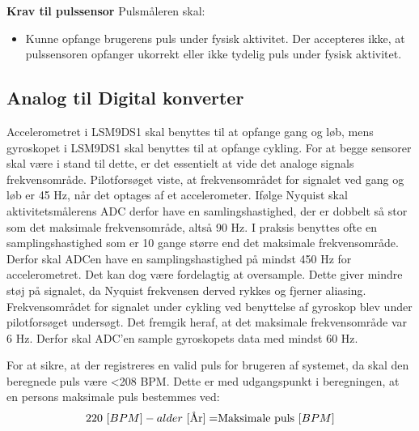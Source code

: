 \textbf{Krav til pulssensor} \newline
Pulsmåleren skal:
\begin{itemize}
\item Kunne opfange brugerens puls under fysisk aktivitet. Der accepteres ikke, at pulssensoren opfanger ukorrekt eller ikke tydelig puls under fysisk aktivitet.
\end{itemize}

\subsection{Analog til Digital konverter} \label{krav_adc}
Accelerometret i LSM9DS1 skal benyttes til at opfange gang og løb, mens gyroskopet i LSM9DS1 skal benyttes til at opfange cykling. For at begge sensorer skal være i stand til dette, er det essentielt at vide det analoge signals frekvensområde. %
Pilotforsøget viste, at frekvensområdet for signalet ved gang og løb er 45 Hz, når det optages af et accelerometer. Ifølge Nyquist skal aktivitetsmålerens ADC derfor have en samlingshastighed, der er dobbelt så stor som det maksimale frekvensområde, altså 90 Hz. I praksis benyttes ofte en samplingshastighed som er 10 gange større end det maksimale frekvensområde. Derfor skal ADCen have en samplingshastighed på mindst 450 Hz for accelerometret. Det kan dog være fordelagtig at oversample. Dette giver mindre støj på signalet, da Nyquist frekvensen derved rykkes og fjerner aliasing. \newline
Frekvensområdet for signalet under cykling ved benyttelse af gyroskop blev under pilotforsøget undersøgt. Det fremgik heraf, at det maksimale frekvensområde var 6 Hz. Derfor skal ADC'en sample gyroskopets data med mindst 60 Hz.

For at sikre, at der registreres en valid puls for brugeren af systemet, da skal den beregnede puls være <208 BPM. Dette er med udgangspunkt i beregningen, at en persons maksimale puls bestemmes ved: \citep{CooperBlair2005} 
\begin{equation}
220~[BPM] - alder~[$År$] = $Maksimale puls$~[BPM]
\end{equation}

